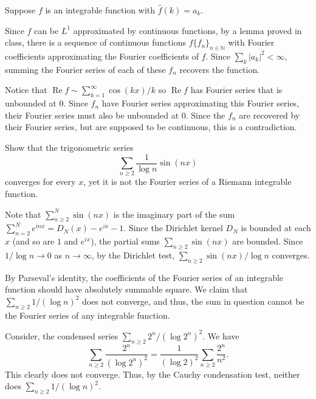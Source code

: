 \documentclass[12 pt, letterpaper]{hmcpset}
\begin{document}
\begin{solution}
	Suppose $f$ is an integrable function with $\hat{f}(k) = a_k$.

	Since $f$ can be $L^{1}$ approximated by continuous functions, by a lemma proved in class, there is a sequence of continuous functions $f\{ f_{n} \}_{n \in \mathbb{N}}$ with Fourier coefficients approximating the Fourier coefficients of $f$. Since $\sum_{k} \lvert a_{k} \rvert^{2} < \infty$, summing the Fourier series of each of these $f_{n}$ recovers the function.

	 Notice that $\operatorname{Re} f \sim \sum_{k = 1}^{\infty} \cos{(kx)}/k$ so $\operatorname{Re} f$ has Fourier series that is unbounded at $0$. Since $f_{n}$ have Fourier series approximating this Fourier series, their Fourier series must also be unbounded at $0$. Since the $f_{n}$ are recovered by their Fourier series, but are supposed to be continuous, this is a contradiction.
\end{solution}

\pagebreak

\begin{problem}[S \& S \S 3.3 \#7]
	Show that the trigonometric series
	\[
		\sum_{n \ge 2} \frac{1}{\log n} \sin{(n x)}
	\]
	converges for every $x$, yet it is not the Fourier series of a Riemann integrable function.
\end{problem}

\begin{solution}
	Note that $\sum_{n \ge 2}^{N} \sin{(n x)}$ is the imaginary part of the sum $\sum_{n = 2}^{N} e^{inx} = D_{N}(x) - e^{ix} - 1$. Since the Dirichlet kernel $D_{N}$ is bounded at each $x$ (and so are $1$ and $e^{ix}$), the partial sums $\sum_{n \ge 2} \sin{(n x)}$ are bounded. Since $1 / \log n \to 0$ as $n \to \infty$, by the Dirichlet test, $\sum_{n \ge 2} \sin{(n x)} / \log n$ converges.

	By Parseval's identity, the coefficients of the Fourier series of an integrable function should have absolutely summable square. We claim that $\sum_{n \ge 2} 1 / (\log n)^{2}$ does not converge, and thus, the sum in question cannot be the Fourier series of any integrable function.

	Consider, the condensed series $\sum_{n \ge 2} 2^{n} / (\log 2^{n})^{2}$. We have
	\[
		\sum_{n \ge 2} \frac{2^{n}}{(\log 2^{n})^{2}} = \frac{1}{(\log 2)^{2}} \sum_{n \ge 2} \frac{2^{n}}{n^{2}}.
	\]
	This clearly does not converge. Thus, by the Cauchy condensation test, neither does $\sum_{n \ge 2} 1/(\log n)^{2}$.
\end{solution}
\end{document}

